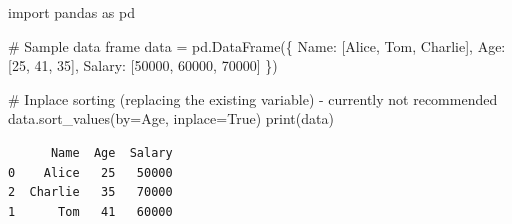 \documentclass[
  english,
  letterpaper,
  DIV=11,
  numbers=noendperiod]{scrreprt}
\newenvironment{Shaded}{\begin{snugshade}}{\end{snugshade}}
\newcommand{\BuiltInTok}[1]{\textcolor[rgb]{0.00,0.23,0.31}{#1}}
\newcommand{\CommentTok}[1]{\textcolor[rgb]{0.37,0.37,0.37}{#1}}
\newcommand{\DecValTok}[1]{\textcolor[rgb]{0.68,0.00,0.00}{#1}}
\newcommand{\ImportTok}[1]{\textcolor[rgb]{0.00,0.46,0.62}{#1}}
\newcommand{\NormalTok}[1]{\textcolor[rgb]{0.00,0.23,0.31}{#1}}
\newcommand{\OperatorTok}[1]{\textcolor[rgb]{0.37,0.37,0.37}{#1}}
\newcommand{\StringTok}[1]{\textcolor[rgb]{0.13,0.47,0.30}{#1}}
\newcommand{\VariableTok}[1]{\textcolor[rgb]{0.07,0.07,0.07}{#1}}
\begin{document}
\begin{Shaded}
\begin{Highlighting}[]
\ImportTok{import}\NormalTok{ pandas }\ImportTok{as}\NormalTok{ pd}

\CommentTok{\# Sample data frame}
\NormalTok{data }\OperatorTok{=}\NormalTok{ pd.DataFrame(\{}
    \StringTok{\textquotesingle{}Name\textquotesingle{}}\NormalTok{: [}\StringTok{\textquotesingle{}Alice\textquotesingle{}}\NormalTok{, }\StringTok{\textquotesingle{}Tom\textquotesingle{}}\NormalTok{, }\StringTok{\textquotesingle{}Charlie\textquotesingle{}}\NormalTok{],}
    \StringTok{\textquotesingle{}Age\textquotesingle{}}\NormalTok{: [}\DecValTok{25}\NormalTok{, }\DecValTok{41}\NormalTok{, }\DecValTok{35}\NormalTok{],}
    \StringTok{\textquotesingle{}Salary\textquotesingle{}}\NormalTok{: [}\DecValTok{50000}\NormalTok{, }\DecValTok{60000}\NormalTok{, }\DecValTok{70000}\NormalTok{]}
\NormalTok{\})}

\CommentTok{\# Inplace sorting (replacing the existing variable) {-} currently not recommended}
\NormalTok{data.sort\_values(by}\OperatorTok{=}\StringTok{\textquotesingle{}Age\textquotesingle{}}\NormalTok{, inplace}\OperatorTok{=}\VariableTok{True}\NormalTok{)}
\BuiltInTok{print}\NormalTok{(data)}
\end{Highlighting}
\end{Shaded}

\begin{verbatim}
      Name  Age  Salary
0    Alice   25   50000
2  Charlie   35   70000
1      Tom   41   60000
\end{verbatim}
\end{document}
